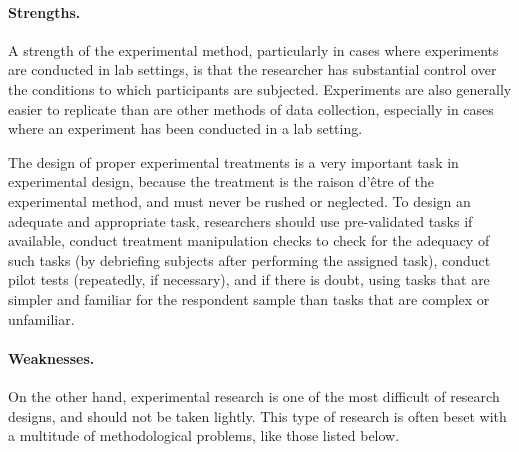 \paragraph{Strengths.} A strength of the experimental method, particularly in cases where experiments are conducted in lab settings, is that the researcher has substantial control over the conditions to which participants are subjected. Experiments are also generally easier to replicate than are other methods of data collection, especially in cases where an experiment has been conducted in a lab setting.

The design of proper experimental treatments is a very important task in experimental design, because the treatment is the raison d'\^{e}tre of the experimental method, and must never be rushed or neglected. To design an adequate and appropriate task, researchers should use pre-validated tasks if available, conduct treatment manipulation checks to check for the adequacy of such tasks (by debriefing subjects after performing the assigned task), conduct pilot tests (repeatedly, if necessary), and if there is doubt, using tasks that are simpler and familiar for the respondent sample than tasks that are complex or unfamiliar.

\paragraph{Weaknesses.} On the other hand, experimental research is one of the most difficult of research designs, and should not be taken lightly. This type of research is often beset with a multitude of methodological problems, like those listed below. 

